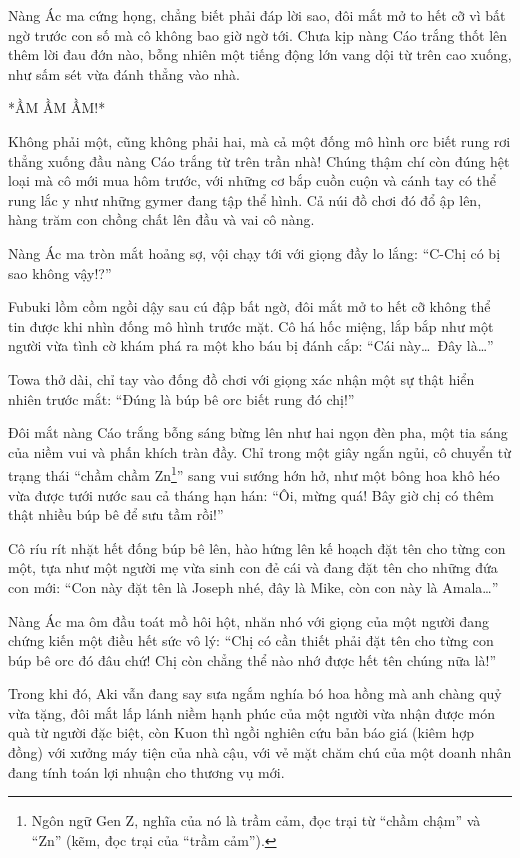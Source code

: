 \documentclass[../main.tex]{subfiles}
\begin{document}
Nàng Ác ma cứng họng, chẳng biết phải đáp lời sao, đôi mắt mở to hết cỡ vì bất ngờ trước con số mà cô không bao giờ ngờ tới. Chưa kịp nàng Cáo trắng thốt lên thêm lời đau đớn nào, bỗng nhiên một tiếng động lớn vang dội từ trên cao xuống, như sấm sét vừa đánh thẳng vào nhà.

*ẦM ẦM ẦM!*

Không phải một, cũng không phải hai, mà cả một đống mô hình orc biết rung rơi thẳng xuống đầu nàng Cáo trắng từ trên trần nhà! Chúng thậm chí còn đúng hệt loại mà cô mới mua hôm trước, với những cơ bắp cuồn cuộn và cánh tay có thể rung lắc y như những gymer đang tập thể hình. Cả núi đồ chơi đó đổ ập lên, hàng trăm con chồng chất lên đầu và vai cô nàng.

Nàng Ác ma tròn mắt hoảng sợ, vội chạy tới với giọng đầy lo lắng: ``C-Chị có bị sao không vậy!?''

Fubuki lồm cồm ngồi dậy sau cú đập bất ngờ, đôi mắt mở to hết cỡ không thể tin được khi nhìn đống mô hình trước mặt. Cô há hốc miệng, lắp bắp như một người vừa tình cờ khám phá ra một kho báu bị đánh cắp: ``Cái này\dots\ Đây là\dots''

Towa thở dài, chỉ tay vào đống đồ chơi với giọng xác nhận một sự thật hiển nhiên trước mắt: ``Đúng là búp bê orc biết rung đó chị!''

Đôi mắt nàng Cáo trắng bỗng sáng bừng lên như hai ngọn đèn pha, một tia sáng của niềm vui và phấn khích tràn đầy. Chỉ trong một giây ngắn ngủi, cô chuyển từ trạng thái ``chầm chầm Zn\footnote{Ngôn ngữ Gen Z, nghĩa của nó là trầm cảm, đọc trại từ ``chầm chậm'' và ``Zn'' (kẽm, đọc trại của ``trầm cảm'').}'' sang vui sướng hớn hở, như một bông hoa khô héo vừa được tưới nước sau cả tháng hạn hán: ``Ôi, mừng quá! Bây giờ chị có thêm thật nhiều búp bê để sưu tầm rồi!''

Cô ríu rít nhặt hết đống búp bê lên, hào hứng lên kế hoạch đặt tên cho từng con một, tựa như một người mẹ vừa sinh con đẻ cái và đang đặt tên cho những đứa con mới: ``Con này đặt tên là Joseph nhé, đây là Mike, còn con này là Amala\dots''

Nàng Ác ma ôm đầu toát mồ hôi hột, nhăn nhó với giọng của một người đang chứng kiến một điều hết sức vô lý: ``Chị có cần thiết phải đặt tên cho từng con búp bê orc đó đâu chứ! Chị còn chẳng thể nào nhớ được hết tên chúng nữa là!''

Trong khi đó, Aki vẫn đang say sưa ngắm nghía bó hoa hồng mà anh chàng quỷ vừa tặng, đôi mắt lấp lánh niềm hạnh phúc của một người vừa nhận được món quà từ người đặc biệt, còn Kuon thì ngồi nghiên cứu bản báo giá (kiêm hợp đồng) với xưởng máy tiện của nhà cậu, với vẻ mặt chăm chú của một doanh nhân đang tính toán lợi nhuận cho thương vụ mới.
\end{document}
